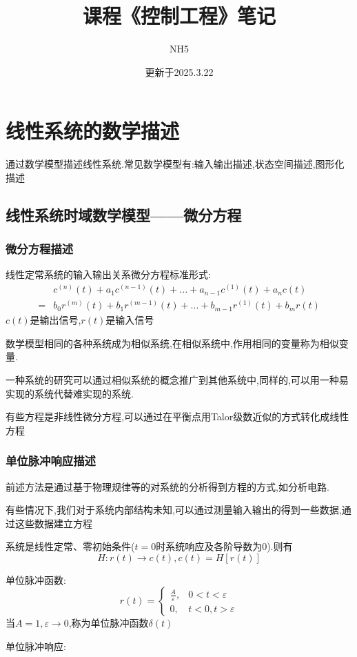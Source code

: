\documentclass[12pt,a4paper,oneside]{ctexart}
\title{课程《控制工程》笔记}
\author{NH5}
\date{更新于2025.3.22}
\begin{document}
\maketitle
\section{线性系统的数学描述}
通过数学模型描述线性系统.常见数学模型有:输入输出描述,状态空间描述,图形化描述

\subsection{线性系统时域数学模型——微分方程}
\subsubsection{微分方程描述}
线性定常系统的输入输出关系微分方程标准形式:
\begin{align*}
    &c^{(n)}(t) + a_1c^{(n-1)}(t) + ... + a_{n-1}c^{(1)}(t) + a_nc(t)\\
    = &b_0r^{(m)}(t) + b_1r^{(m-1)}(t) + ... + b_{m-1}r^{(1)}(t) + b_mr(t)
\end{align*}
$c(t)$是输出信号,$r(t)$是输入信号

数学模型相同的各种系统成为相似系统,在相似系统中,作用相同的变量称为相似变量.

一种系统的研究可以通过相似系统的概念推广到其他系统中,同样的,可以用一种易实现的系统代替难实现的系统.

有些方程是非线性微分方程,可以通过在平衡点用Talor级数近似的方式转化成线性方程

\subsubsection{单位脉冲响应描述}
前述方法是通过基于物理规律等的对系统的分析得到方程的方式,如分析电路.

有些情况下,我们对于系统内部结构未知,可以通过测量输入输出的得到一些数据,通过这些数据建立方程

系统是线性定常、零初始条件($t=0$时系统响应及各阶导数为$0$).则有
\[
    H:r(t) \to c(t),c(t) = H[r(t)]
\]

单位脉冲函数:
\[
    r(t)=\begin{cases}
        \frac{A}{\varepsilon}, &0<t<\varepsilon \\
        0, & t<0,t>\varepsilon
    \end{cases}
\]
当$A=1,\varepsilon \to 0$,称为单位脉冲函数$\delta(t)$

单位脉冲响应:
\end{document}
